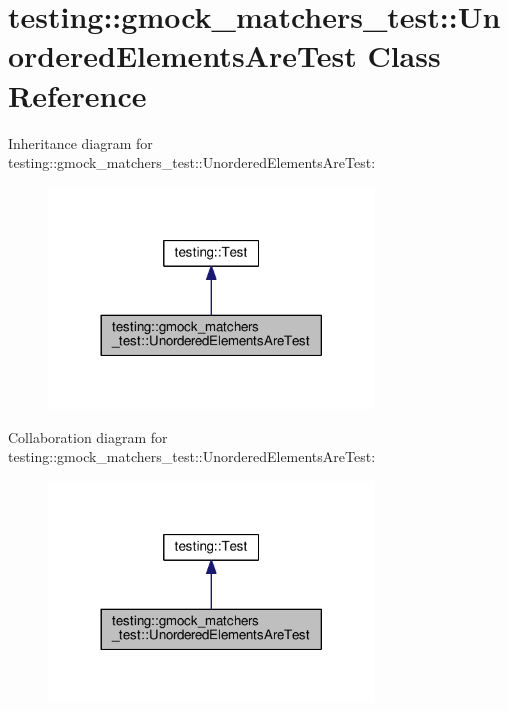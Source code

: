 \hypertarget{classtesting_1_1gmock__matchers__test_1_1UnorderedElementsAreTest}{}\section{testing\+:\+:gmock\+\_\+matchers\+\_\+test\+:\+:Unordered\+Elements\+Are\+Test Class Reference}
\label{classtesting_1_1gmock__matchers__test_1_1UnorderedElementsAreTest}


Inheritance diagram for testing\+:\+:gmock\+\_\+matchers\+\_\+test\+:\+:Unordered\+Elements\+Are\+Test\+:
\nopagebreak
\begin{figure}[H]
\begin{center}
\leavevmode
\includegraphics[width=245pt]{classtesting_1_1gmock__matchers__test_1_1UnorderedElementsAreTest__inherit__graph}
\end{center}
\end{figure}


Collaboration diagram for testing\+:\+:gmock\+\_\+matchers\+\_\+test\+:\+:Unordered\+Elements\+Are\+Test\+:
\nopagebreak
\begin{figure}[H]
\begin{center}
\leavevmode
\includegraphics[width=245pt]{classtesting_1_1gmock__matchers__test_1_1UnorderedElementsAreTest__coll__graph}
\end{center}
\end{figure}
